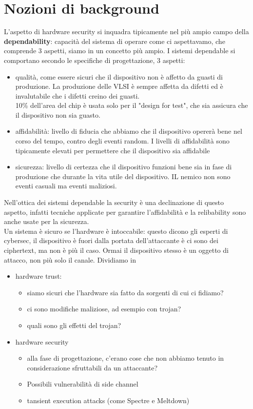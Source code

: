 \documentclass[oneside, 12pt]{extbook}
\begin{document}
\section{Nozioni di background}
L'aspetto di hardware security si inquadra tipicamente nel più ampio campo della \textbf{dependability}: capacità del sistema di operare come ci aspettavamo, che comprende 3 aspetti, siamo in un concetto più ampio. I sistemi dependable si comportano secondo le specifiche di progettazione, 3 aspetti:
\begin{itemize}
	\item qualità, come essere sicuri che il dispositivo non è affetto da guasti di produzione. La produzione delle VLSI è sempre affetta da difetti ed è invalutabile che i difetti creino dei guasti.\\10\% dell'area del chip è usata solo per il "design for test", che sia assicura che il dispositivo non sia guasto.
	\item affidabilità: livello di fiducia che abbiamo che il dispositivo opererà bene nel corso del tempo, contro degli eventi random. I livelli di affidabilità sono tipicamente elevati per permettere che il dispositivo sia affidabile
	\item sicurezza: livello di certezza che il dispositivo funzioni bene sia in fase di produzione che durante la vita utile del dispositivo. IL nemico non sono eventi casuali ma eventi maliziosi.
\end{itemize}
Nell'ottica dei sistemi dependable la security è una declinazione di questo aspetto, infatti tecniche applicate per garantire l'affidabilità e la relibability sono anche usate per la sicurezza.\\Un sistema è sicuro se l'hardware è intoccabile: questo dicono gli esperti di cybersec, il dispositivo è fuori dalla portata dell'attaccante è ci sono dei ciphertext, ma non è più il caso. Ormai il dispositivo stesso è un oggetto di attacco, non più solo il canale. Dividiamo in
\begin{itemize}
	\item hardware trust:
	\begin{itemize}
		\item siamo sicuri che l'hardware sia fatto da sorgenti di cui ci fidiamo?
		\item ci sono modifiche maliziose, ad esempio con trojan?
		\item quali sono gli effetti del trojan?
	\end{itemize}
	\item hardware security
	\begin{itemize}
		\item alla fase di progettazione, c'erano cose che non abbiamo tenuto in considerazione sfruttabili da un attaccante?
		\item Possibili vulnerabilità di side channel
		\item tansient execution attacks (come Spectre e Meltdown)
	\end{itemize}
\end{itemize}
\end{document}
